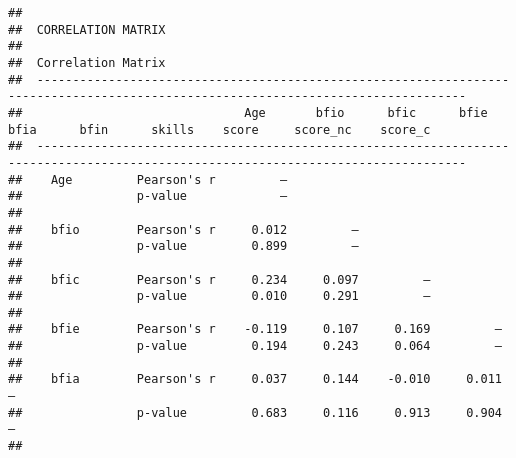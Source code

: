 \documentclass[]{article}
\begin{document}
\begin{verbatim}
## 
##  CORRELATION MATRIX
## 
##  Correlation Matrix                                                                                                                 
##  ---------------------------------------------------------------------------------------------------------------------------------- 
##                               Age       bfio      bfic      bfie      bfia      bfin      skills    score     score_nc    score_c   
##  ---------------------------------------------------------------------------------------------------------------------------------- 
##    Age         Pearson's r         —                                                                                                
##                p-value             —                                                                                                
##                                                                                                                                     
##    bfio        Pearson's r     0.012         —                                                                                      
##                p-value         0.899         —                                                                                      
##                                                                                                                                     
##    bfic        Pearson's r     0.234     0.097         —                                                                            
##                p-value         0.010     0.291         —                                                                            
##                                                                                                                                     
##    bfie        Pearson's r    -0.119     0.107     0.169         —                                                                  
##                p-value         0.194     0.243     0.064         —                                                                  
##                                                                                                                                     
##    bfia        Pearson's r     0.037     0.144    -0.010     0.011         —                                                        
##                p-value         0.683     0.116     0.913     0.904         —                                                        
##                                                                                                                                     

\end{verbatim}
\end{document}
